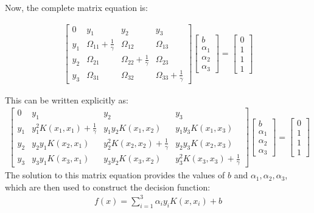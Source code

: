 Now, the complete matrix equation is:

\begin{align*}
	\begin{bmatrix}
	0 & y_1 & y_2 & y_3 \\
	y_1 & \Omega_{11} + \frac{1}{\gamma} & \Omega_{12} & \Omega_{13} \\
	y_2 & \Omega_{21} & \Omega_{22} + \frac{1}{\gamma} & \Omega_{23} \\
	y_3 & \Omega_{31} & \Omega_{32} & \Omega_{33} + \frac{1}{\gamma}
	\end{bmatrix}
	\begin{bmatrix}
	b \\
	\alpha_1 \\
	\alpha_2 \\
	\alpha_3
	\end{bmatrix}
	=
	\begin{bmatrix}
	0 \\
	1 \\
	1 \\
	1
	\end{bmatrix}
\end{align*}

This can be written explicitly as:
\begin{align*}
	\begin{bmatrix}
	0 & y_1 & y_2 & y_3 \\
	y_1 & y_1^2 K(x_1, x_1) + \frac{1}{\gamma} & y_1 y_2 K(x_1, x_2) & y_1 y_3 K(x_1, x_3) \\
	y_2 & y_2 y_1 K(x_2, x_1) & y_2^2 K(x_2, x_2) + \frac{1}{\gamma} & y_2 y_3 K(x_2, x_3) \\
	y_3 & y_3 y_1 K(x_3, x_1) & y_3 y_2 K(x_3, x_2) & y_3^2 K(x_3, x_3) + \frac{1}{\gamma}
	\end{bmatrix}
	\begin{bmatrix}
	b \\
	\alpha_1 \\
	\alpha_2 \\
	\alpha_3
	\end{bmatrix}
	=
	\begin{bmatrix}
	0 \\
	1 \\
	1 \\
	1
	\end{bmatrix}
\end{align*}
The solution to this matrix equation provides the values of $b$ and $ \alpha_1, \alpha_2, \alpha_3$, which are then used to construct the decision function:
\begin{align*}
	f(x) = \sum_{i=1}^3 \alpha_i y_i K(x, x_i) + b
\end{align*}
